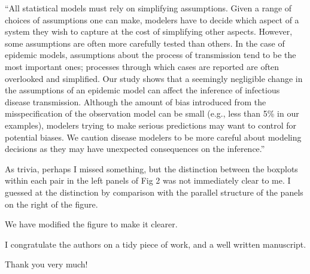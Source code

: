 \documentclass[12pt]{article}
\newcommand{\revtext}{\textsf}
\begin{document}
``All statistical models must rely on simplifying assumptions.
Given a range of choices of assumptions one can make, modelers have to
decide which aspect of a system they wish to capture 
at the cost of simplifying other aspects.
However, some assumptions are often more carefully tested than others.
In the case of epidemic models, assumptions about the process of transmission tend to be
the most important ones; processes through which cases are reported are often 
overlooked and simplified.
Our study shows that a seemingly negligible change in the assumptions of an epidemic
model can affect the inference of 
infectious disease transmission.
Although the amount of bias introduced from the misspecification of the observation
model can be small (e.g., less than 5\% in our examples), modelers
trying to make serious predictions may want to control for potential biases.
We caution disease modelers to be more careful about modeling decisions as they may have unexpected consequences on the inference.''

\revtext{As trivia, perhaps I missed something, but the distinction between the boxplots within each pair in the left panels of Fig 2 was not immediately clear to me.  I guessed at the distinction by comparison with the parallel structure of the panels on the right of the figure.}

We have modified the figure to make it clearer.

\revtext{I congratulate the authors on a tidy piece of work, and a well written manuscript.}

Thank you very much!
\end{document}
